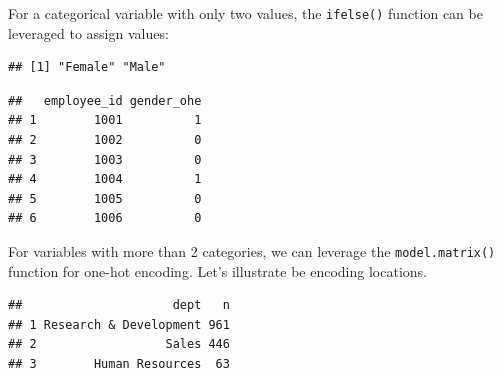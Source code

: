 \documentclass[]{book}
\newenvironment{Shaded}{\begin{snugshade}}{\end{snugshade}}
\newcommand{\CommentTok}[1]{\textcolor[rgb]{0.56,0.35,0.01}{\textit{#1}}}
\newcommand{\DataTypeTok}[1]{\textcolor[rgb]{0.13,0.29,0.53}{#1}}
\newcommand{\DecValTok}[1]{\textcolor[rgb]{0.00,0.00,0.81}{#1}}
\newcommand{\KeywordTok}[1]{\textcolor[rgb]{0.13,0.29,0.53}{\textbf{#1}}}
\newcommand{\NormalTok}[1]{#1}
\newcommand{\OperatorTok}[1]{\textcolor[rgb]{0.81,0.36,0.00}{\textbf{#1}}}
\newcommand{\OtherTok}[1]{\textcolor[rgb]{0.56,0.35,0.01}{#1}}
\newcommand{\StringTok}[1]{\textcolor[rgb]{0.31,0.60,0.02}{#1}}
\begin{document}
For a categorical variable with only two values, the \texttt{ifelse()} function can be leveraged to assign values:

\begin{Shaded}
\end{Shaded}

\begin{verbatim}
## [1] "Female" "Male"
\end{verbatim}

\begin{Shaded}
\end{Shaded}

\begin{verbatim}
##   employee_id gender_ohe
## 1        1001          1
## 2        1002          0
## 3        1003          0
## 4        1004          1
## 5        1005          0
## 6        1006          0
\end{verbatim}

For variables with more than 2 categories, we can leverage the \texttt{model.matrix()} function for one-hot encoding. Let's illustrate be encoding locations.

\begin{Shaded}
\end{Shaded}

\begin{verbatim}
##                     dept   n
## 1 Research & Development 961
## 2                  Sales 446
## 3        Human Resources  63
\end{verbatim}
\end{document}

